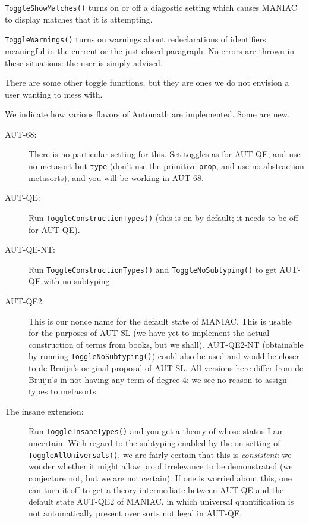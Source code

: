 \documentclass[12pt]{article}
\begin{document}
{\tt ToggleShowMatches()}  turns on or off a diagostic setting which causes MANIAC to display matches that it is attempting.

{\tt ToggleWarnings()} turns on warnings about redeclarations of identifiers meaningful in the current or the just closed paragraph.  No errors are thrown in these situations:  the user is simply advised.

There are some other toggle functions, but they are ones we do not envision a user wanting to mess with.

We indicate how various flavors of Automath are implemented.  Some are new.

\begin{description}

\item[AUT-68:]  There is no particular setting for this.  Set toggles as for AUT-QE, and use no metasort but {\tt type}  (don't use the primitive {\tt prop}, and use no abstraction metasorts), and you will be working in AUT-68.

\item[AUT-QE:]  Run {\tt ToggleConstructionTypes()}  (this is on by default;  it needs to be off for AUT-QE).

\item[AUT-QE-NT:]  Run {\tt ToggleConstructionTypes()} and {\tt ToggleNoSubtyping()} to get AUT-QE with no subtyping.

\item[AUT-QE2:]  This is our nonce name for the default state of MANIAC.  This is usable for the purposes of AUT-SL (we have yet to implement the actual construction of terms from books, but we shall).  AUT-QE2-NT (obtainable by running {\tt ToggleNoSubtyping()}) could also be used and would be closer to de Bruijn's original proposal of AUT-SL.  All versions here differ from de Bruijn's in not having any term of degree 4:  we see no reason to assign types to metasorts.

\item[The insane extension:]  Run {\tt ToggleInsaneTypes()} and you get a theory of whose status I am uncertain.  With regard to the subtyping enabled by the on setting of
{\tt ToggleAllUniversals()}, we are fairly certain that this is {\em consistent\/}:  we wonder whether it might allow proof irrelevance to be demonstrated (we conjecture not, but we are not certain).  If one is worried about this, one can turn it off to get a theory intermediate between AUT-QE and the default state AUT-QE2 of MANIAC, in which universal quantification is not automatically present over sorts not legal in AUT-QE.



\end{description}
\end{document}
